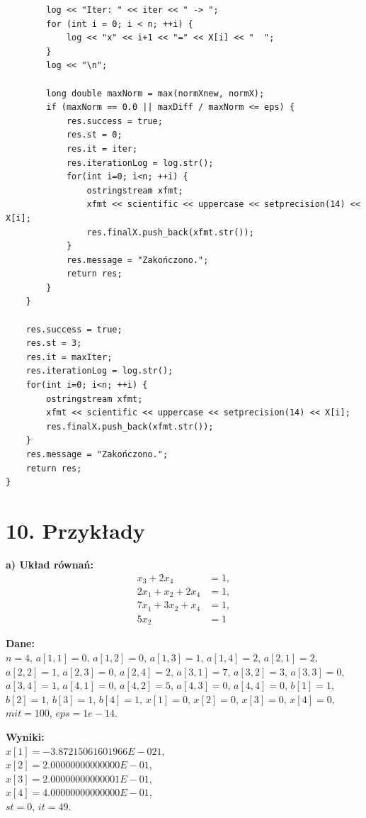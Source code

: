 \documentclass[11pt,a4paper]{article}
\begin{document}
\begin{verbatim}
        log << "Iter: " << iter << " -> ";
        for (int i = 0; i < n; ++i) {
            log << "x" << i+1 << "=" << X[i] << "  ";
        }
        log << "\n";
        
        long double maxNorm = max(normXnew, normX);
        if (maxNorm == 0.0 || maxDiff / maxNorm <= eps) {
            res.success = true;
            res.st = 0;
            res.it = iter;
            res.iterationLog = log.str();
            for(int i=0; i<n; ++i) {
                ostringstream xfmt;
                xfmt << scientific << uppercase << setprecision(14) << X[i];
                res.finalX.push_back(xfmt.str());
            }
            res.message = "Zakończono.";
            return res;
        }
    }
    
    res.success = true;
    res.st = 3;
    res.it = maxIter;
    res.iterationLog = log.str();
    for(int i=0; i<n; ++i) {
        ostringstream xfmt;
        xfmt << scientific << uppercase << setprecision(14) << X[i];
        res.finalX.push_back(xfmt.str());
    }
    res.message = "Zakończono.";
    return res;
}
\end{verbatim}

\section*{10. Przykłady}

\vspace{1em}
\noindent \textbf{a) Układ równań:}
\begin{align*}
    x_{3}+2x_{4} &= 1, \\
    2x_{1}+x_{2}+2x_{4} &= 1, \\
    7x_{1}+3x_{2}+x_{4} &= 1, \\
    5x_{2} &= 1
\end{align*}

\noindent \textbf{Dane:} \\
$n=4$, $a[1,1]=0$, $a[1,2]=0$, $a[1,3]=1$, $a[1,4]=2$, $a[2,1]=2$, $a[2,2]=1$, $a[2,3]=0$, $a[2,4]=2$, $a[3,1]=7$, $a[3,2]=3$, $a[3,3]=0$, $a[3,4]=1$, $a[4,1]=0$, $a[4,2]=5$, $a[4,3]=0$, $a[4,4]=0$, $b[1]=1$, $b[2]=1$, $b[3]=1$, $b[4]=1$, $x[1]=0$, $x[2]=0$, $x[3]=0$, $x[4]=0$, $mit=100$, $eps=1e-14$.

\vspace{0.5em}
\noindent \textbf{Wyniki:} \\
$x[1]= -3.87215061601966E-021$, \\
$x[2]= 2.00000000000000E-01$, \\
$x[3]= 2.00000000000001E-01$, \\
$x[4]= 4.00000000000000E-01$, \\
$st=0$, $it=49$.
\end{document}
